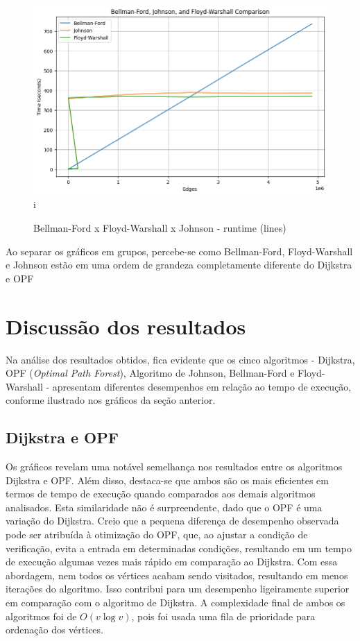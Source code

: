 \documentclass[12pt]{article}
\begin{document}
\begin{figure}[H]
    \centering
        \includegraphics[scale=0.5]{belljohnsonfloyd.png}{i}
        \caption{Bellman-Ford x Floyd-Warshall x Johnson - runtime (lines)}
\end{figure}

Ao separar os gráficos em grupos, percebe-se como Bellman-Ford, Floyd-Warshall e Johnson estão em uma ordem de grandeza completamente diferente do Dijkstra e OPF

\section{Discussão dos resultados}

Na análise dos resultados obtidos, fica evidente que os cinco algoritmos - Dijkstra, OPF (\textit{Optimal Path Forest}), Algoritmo de Johnson, Bellman-Ford e Floyd-Warshall - apresentam diferentes desempenhos em relação ao tempo de execução, conforme ilustrado nos gráficos da seção anterior.

\subsection{Dijkstra e OPF}

Os gráficos revelam uma notável semelhança nos resultados entre os algoritmos Dijkstra e OPF. Além disso, destaca-se que ambos são os mais eficientes em termos de tempo de execução quando comparados aos demais algoritmos analisados. Esta similaridade não é surpreendente, dado que o OPF é uma variação do Dijkstra. Creio que a pequena diferença de desempenho observada pode ser atribuída à otimização do OPF, que, ao ajustar a condição de verificação, evita a entrada em determinadas condições, resultando em um tempo de execução algumas vezes mais rápido em comparação ao Dijkstra. Com essa abordagem, nem todos os vértices acabam sendo visitados, resultando em menos iterações do algoritmo. Isso contribui para um desempenho ligeiramente superior em comparação com o algoritmo de Dijkstra. A complexidade final de ambos os algoritmos foi de $O(v\log{}v)$, pois foi usada uma fila de prioridade para ordenação dos vértices.
\end{document}
